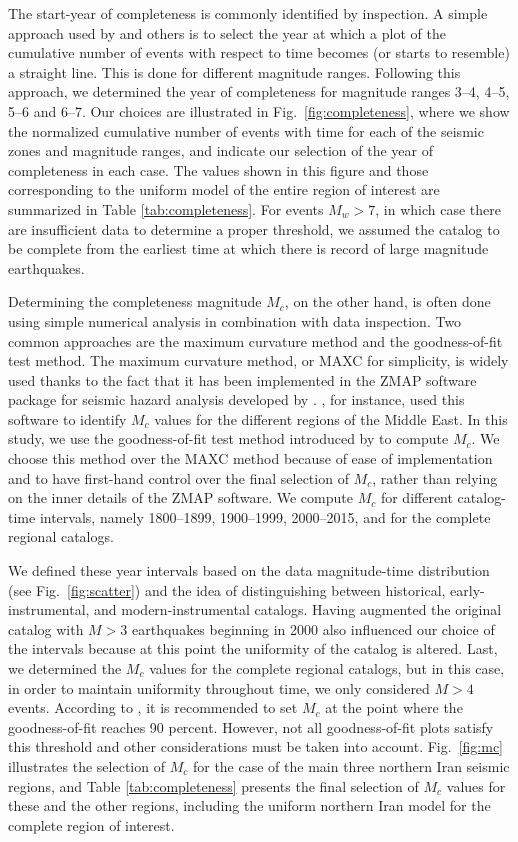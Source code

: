 The start-year of completeness is commonly identified by inspection. A simple approach used by \citet{Frankel1995} and others is to select the year at which a plot of the cumulative number of events with respect to time becomes (or starts to resemble) a straight line. This is done for different magnitude ranges. Following this approach, we determined the year of completeness for magnitude ranges 3--4, 4--5, 5--6 and 6--7. Our choices are illustrated in Fig.~\ref{fig:completeness}, where we show the normalized cumulative number of events with time for each of the seismic zones and magnitude ranges, and indicate our selection of the year of completeness in each case. The values shown in this figure and those corresponding to the uniform model of the entire region of interest are summarized in Table \ref{tab:completeness}. For events $M_w>7$, in which case there are insufficient data to determine a proper threshold, we assumed the catalog to be complete from the earliest time at which there is record of large magnitude earthquakes.

Determining the completeness magnitude $M_c$, on the other hand, is often done using simple numerical analysis in combination with data inspection. Two common approaches are the maximum curvature method and the goodness-of-fit test method. The maximum curvature method, or MAXC for simplicity, is widely used thanks to the fact that it has been implemented in the ZMAP software package for seismic hazard analysis developed by \citet{Wiemer2001}. \citet{Zare2014}, for instance, used this software to identify $M_c$ values for the different regions of the Middle East. In this study, we use the goodness-of-fit test method introduced by \citet{Wiemer2000} to compute $M_c$. We choose this method over the MAXC method because of ease of implementation and to have first-hand control over the final selection of $M_c$, rather than relying on the inner details of the ZMAP software. We compute $M_c$ for different catalog-time intervals, namely 1800--1899, 1900--1999, 2000--2015, and for the complete regional catalogs.

We defined these year intervals based on the data magnitude-time distribution (see Fig.~\ref{fig:scatter}) and the idea of distinguishing between historical, early-instrumental, and modern-instrumental catalogs. Having augmented the original catalog with $M>3$ earthquakes beginning in 2000 also influenced our choice of the intervals because at this point the uniformity of the catalog is altered. Last, we determined the $M_c$ values for the complete regional catalogs, but in this case, in order to maintain uniformity throughout time, we only considered $M>4$ events. According to \citet{Wiemer2000}, it is recommended to set $M_c$ at the point where the goodness-of-fit reaches 90 percent. However, not all goodness-of-fit plots satisfy this threshold and other considerations must be taken into account. Fig.~\ref{fig:mc} illustrates the selection of $M_c$ for the case of the main three northern Iran seismic regions, and Table \ref{tab:completeness} presents the final selection of $M_c$ values for these and the other regions, including the uniform northern Iran model for the complete region of interest.

